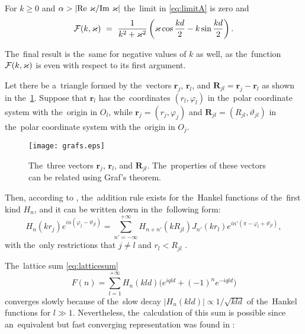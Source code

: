 For $k \ge 0$ and $\alpha > \left|\textrm{Re }\varkappa/\textrm{Im }\varkappa\right|$ the~limit in \cref{eq:limitA} is zero and
\begin{equation}
{\mathcal F}(k, \varkappa)~=~\frac{1}{k^2+\varkappa^2}\left(\varkappa \cos\frac{kd}{2}-k\sin\frac{kd}{2}\right).
\end{equation}

The~final result is the~same for negative values of $k$ as well, as the~function ${\mathcal F}(k,\varkappa)$ is even with respect to its first argument.



\label{appGrafTheorem}

Let there be a~triangle formed by the~vectors $\mathbf{r}_j$, $\mathbf{r}_l$, and $\mathbf{R}_{jl} = \mathbf{r}_j - \mathbf{r}_l$ as shown in the~\cref{fig:grafB}.
Suppose that $\mathbf{r}_l$ has the~coordinates $\left(r_l, \varphi_l\right)$ in the~polar coordinate system with the~origin in $O_l$, while $\mathbf{r}_j = \left(r_j, \varphi_j\right)$ and $\mathbf{R}_{jl} = \left(R_{jl}, \vartheta_{jl}\right)$ in the~polar coordinate system with the~origin in $O_j$.

\begin{figure}
\texttt{[image: grafs.eps]}
\caption{The~three vectors $\mathbf{r}_j$, $\mathbf{r}_l$, and $\mathbf{R}_{jl}$. The~properties of these vectors can be related using Graf's theorem.}
\label{fig:grafB}
\end{figure}

Then, according to \cite{abramowitz}, the~addition rule exists for the~Hankel functions of the~first kind $H_n$, and it can be written down in the~following form:
\begin{equation}
\label{eq:grafB}
H_n \left(kr_{j}\right) e^{in\left(\varphi_{j}-\vartheta_{jl}\right)} = \sum\limits_{n'=-\infty}^{+\infty} H_{n+n'}\left(kR_{jl}\right) J_{n'}\left(kr_{l}\right) e^{in'\left(\pi-\varphi_{l}+\vartheta_{jl}\right)},
\end{equation}
with the~only restrictions that $j \neq l$ and $r_l < R_{jl}$ \cite{wikiwaves}.



\label{appConvSeries}

The~lattice sum \cref{eq:latticesum}
\begin{equation*}
F(n) = \sum\limits_{l=1}^{+\infty} H_{n}\left(k ld\right) \Big(e^{i q l d} + (-1)^{n} e^{-i q l d}\Big)
\end{equation*}
converges slowly because of the~slow decay $|H_n(kld)| \propto 1/\sqrt{kld}$ of the~Hankel functions for $l \gg 1$.
Nevertheless, the~calculation of this sum is possible since an~equivalent but fast converging representation was found in \cite{twersky}:

